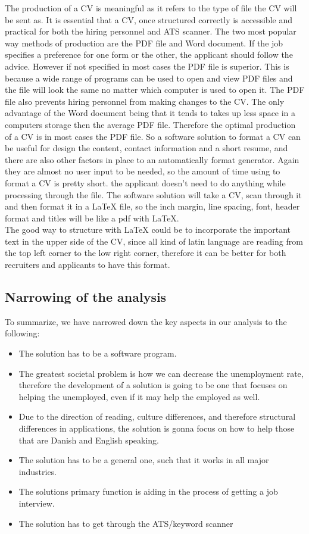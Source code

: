 The production of a CV is meaningful as it refers to the type of file the CV will be sent as.
It is essential that a CV, once structured correctly is accessible and practical for both the hiring personnel and ATS scanner.
The two most popular way methods of production are the PDF file and Word document.
If the job specifies a preference for one form or the other, the applicant should follow the advice.
However if not specified in most cases the PDF file is superior.
This is because a wide range of programs can be used to open and view PDF files and the file will look the same no matter which computer is used to open it.
The PDF file also prevents hiring personnel from making changes to the CV. 
The only advantage of the Word document being that it tends to takes up less space in a computers storage then the average PDF file.
Therefore the optimal production of a CV is in most cases the PDF file.
So a software solution to format a CV can be useful for design the content, contact information and a short resume,
and there are also other factors in place to an automatically format generator. Again they are almost no user input to be needed, 
so the amount of time using to format a CV is pretty short. 
the applicant doesn't need to do anything while processing through the file. The software solution will take a CV, scan through it and
then format it in a LaTeX file, so the inch margin, line spacing, font, header format and titles 
will be like a pdf with LaTeX.\\
The good way to structure with LaTeX could be to incorporate the important text in the upper side of the CV, 
since all kind of latin language are reading from the top left corner to the low right corner, therefore it can be better
for both recruiters and applicants to have this format\cite{Pdf_vs_word}.\\


\subsection{Narrowing of the analysis}
To summarize, we have narrowed down the key aspects in our analysis to the
following:
\begin{itemize}
  \item The solution has to be a software program.
  \item The greatest societal problem is how we can decrease the unemployment rate, 
  therefore the development of a solution is going to be one that focuses on helping the unemployed, 
  even if it may help the employed as well.
  \item Due to the direction of reading, culture differences, 
  and therefore structural differences in applications, the solution is gonna focus
  on how to help those that are Danish and English speaking.
  \item The solution has to be a general one, such that it works in all major industries.
  \item The solutions primary function is aiding in the process of getting a job interview.
  \item The solution has to get through the ATS/keyword scanner
\end{itemize}
